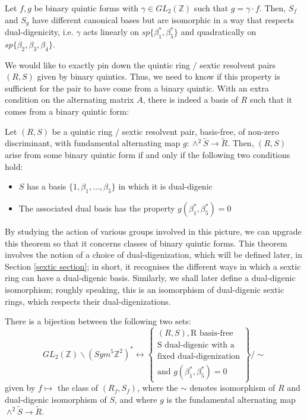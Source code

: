 \documentclass{report}
\begin{document}
\begin{theorem}
Let $f,g$ be binary quintic forms with $\gamma \in GL_2(\mathbb{Z})$ such that $g = \gamma \cdot f$.  Then, $S_f$ and $S_g$ have different canonical bases but are isomorphic in a way that respects dual-digenicity, i.e. $\gamma$ acts linearly on $sp \{\beta_1^*, \beta_5^*\}$ and quadratically on $sp \{\beta_2,\beta_3,\beta_4\}$.
\end{theorem}

We would like to exactly pin down the quintic ring / sextic resolvent pairs $(R,S)$ given by binary quintics.  Thus, we need to know if this property is sufficient for the pair to have come from a binary quintic.  With an extra condition on the alternating matrix $A$, there is indeed a basis of $R$ such that it comes from a binary quintic form:
\begin{theorem}
Let $(R,S)$ be a quintic ring / sextic resolvent pair, basis-free, of non-zero discriminant, with fundamental alternating map $g : \wedge^2 \tilde{S} \to \tilde{R}$.  Then, $(R,S)$ arise from some binary quintic form if and only if the following two conditions hold:
\begin{itemize}
\item $S$ has a basis $\{1,\beta_1,\ldots,\beta_5\}$ in which it is dual-digenic
\item The associated dual basis has the property $g(\beta_1^*,\beta_5^*) = 0$
\end{itemize}
\end{theorem}

By studying the action of various groups involved in this picture, we can upgrade this theorem so that it concerns classes of binary quintic forms.  This theorem involves the notion of a choice of dual-digenization, which will be defined later, in Section \ref{sextic section}; in short, it recognises the different ways in which a sextic ring can have a dual-digenic basis.  Similarly, we shall later define a dual-digenic isomorphism; roughly speaking, this is an isomorphism of dual-digenic sextic rings, which respects their dual-digenizations.
\begin{theorem}
There is a bijection between the following two sets:
\begin{equation}
GL_2(\mathbb{Z}) \backslash 
(Sym^5 \mathbb{Z}^2)^* \leftrightarrow
\left\{
\begin{array}{l}
(R,S), \text{R basis-free} \\
\text{S dual-digenic with a} \\
\text{fixed dual-digenization} \\
\text{and } g(\beta_1^*,\beta_5^*) = 0 
\end{array}
\right\}
 / \sim
\end{equation}
given by $f \mapsto$ the class of $(R_f, S_f)$, where the $\sim$ denotes isomorphism of $R$ and dual-digenic isomorphism of $S$, and where $g$ is the fundamental alternating map $\wedge^2 \tilde{S} \to \tilde{R}$.
\end{theorem}
\end{document}
